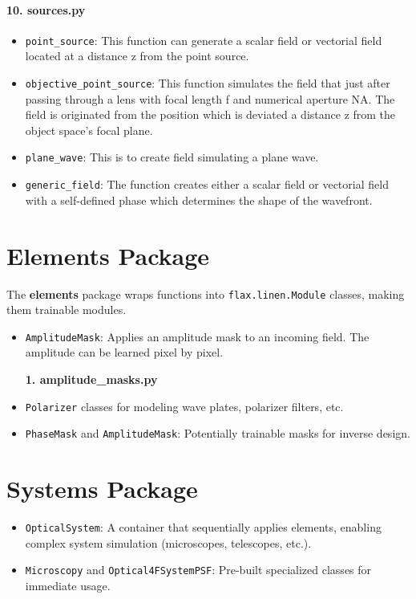 \documentclass[a4paper,12pt]{report}
\begin{document}
\paragraph*{10. \textbf{sources.py}}
\begin{itemize}
  \item \texttt{point\_source}: This function can generate a scalar field or vectorial field located at a distance z from the point source.
  \item \texttt{objective\_point\_source}: This function simulates the field that just after passing through a lens with focal length f and numerical aperture NA. The field is originated from the position which is deviated a distance z from the object space's focal plane.
  \item \texttt{plane\_wave}: This is to create field simulating a plane wave.
  \item \texttt{generic\_field}: The function creates either a scalar field or vectorial field with a self-defined phase which determines the shape of the wavefront.
\end{itemize}



\section{Elements Package}
The \textbf{elements} package wraps functions into \texttt{flax.linen.Module} classes, making them trainable modules.
\begin{itemize}

    \item \texttt{AmplitudeMask}: Applies an amplitude mask to an incoming field. The amplitude can be learned pixel by pixel.
    
    \vspace{1em}
    {\large \textbf{1. amplitude\_masks.py}}
    \item \texttt{Polarizer} classes for modeling wave plates, polarizer filters, etc.
    \item \texttt{PhaseMask} and \texttt{AmplitudeMask}: Potentially trainable masks for inverse design.
\end{itemize}

\section{Systems Package}
\begin{itemize}
    \item \texttt{OpticalSystem}: A container that sequentially applies elements, enabling complex system simulation (microscopes, telescopes, etc.).
    \item \texttt{Microscopy} and \texttt{Optical4FSystemPSF}: Pre-built specialized classes for immediate usage.
\end{itemize}
\end{document}
